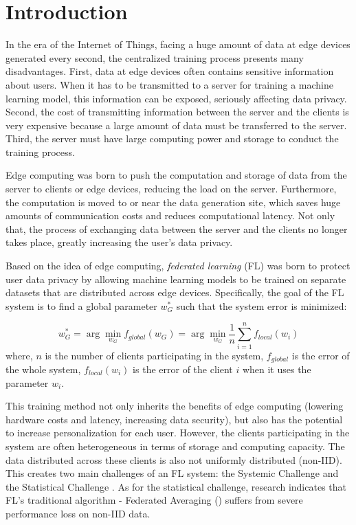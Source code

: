 \documentclass[runningheads]{llncs}
\begin{document}
\section{Introduction}

In the era of the Internet of Things, facing a huge amount of data at edge devices generated every second, the centralized training process presents many disadvantages. First, data at edge devices often contains sensitive information about users. When it has to be transmitted to a server for training a machine learning model, this information can be exposed, seriously affecting data privacy. Second, the cost of transmitting information between the server and the clients is very expensive because a large amount of data must be transferred to the server. Third, the server must have large computing power and storage to conduct the training process.

Edge computing \cite{khan2019edge} was born to push the computation and storage of data from the server to clients or edge devices, reducing the load on the server. Furthermore, the computation is moved to or near the data generation site, which saves huge amounts of communication costs and reduces computational latency. Not only that, the process of exchanging data between the server and the clients no longer takes place, greatly increasing the user's data privacy.

Based on the idea of edge computing, \textit{federated learning} (FL) \cite{mcmahan2017communication} was born to protect user data privacy by allowing machine learning models to be trained on separate datasets that are distributed across edge devices. Specifically, the goal of the FL system is to find a global parameter $w_G^*$ such that the system error is minimized:

\begin{dmath}
    w_G^* = \arg\min_{w_G}{f_{global}(w_G)}
        = \arg\min_{w_G}{\frac{1}{n} \sum_{i=1}^n{f_{local}(w_i)}}
\end{dmath} where, $n$ is the number of clients participating in the system, $f_{global}$ is the error of the whole system, $f_{local}(w_i)$ is the error of the client $i$ when it uses the parameter $w_i$.

This training method not only inherits the benefits of edge computing (lowering hardware costs and latency, increasing data security), but also has the potential to increase personalization for each user. However, the clients participating in the system are often heterogeneous in terms of storage and computing capacity. The data distributed across these clients is also not uniformly distributed (non-IID). This creates two main challenges of an FL system: the Systemic Challenge and the Statistical Challenge \cite{li2020federated}. As for the statistical challenge, \cite{zhao2018federated} research indicates that FL's traditional algorithm - Federated Averaging () suffers from severe performance loss on non-IID data.
\end{document}
